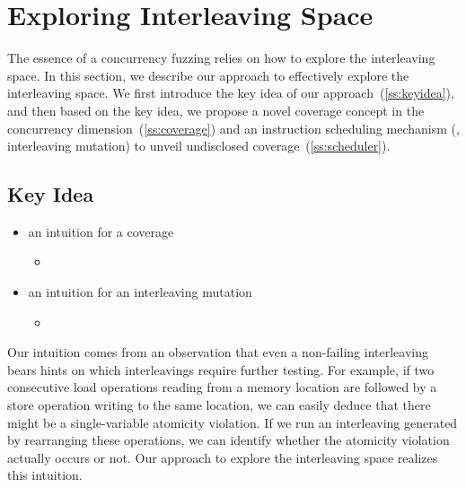 \section{Exploring Interleaving Space}
\label{s:design}

\newcommand{\segment}{segment graph\xspace}
\newcommand{\segments}{segment graphs\xspace}
\newcommand{\Segments}{Segment graphs\xspace}

\newcommand{\mutable}{mutable edge\xspace}
\newcommand{\mutables}{mutable edges\xspace}
\newcommand{\immutable}{immutable edge\xspace}
\newcommand{\immutables}{immutable edges\xspace}


The essence of a concurrency fuzzing relies on how to explore the
interleaving space.
%
In this section, we describe our approach to effectively explore the
interleaving space.
%
We first introduce the key idea of our
approach~(\autoref{ss:keyidea}), and then based on the key idea, we
propose a novel coverage concept in the concurrency
dimension~(\autoref{ss:coverage}) and an instruction scheduling
mechanism (\ie, interleaving mutation) to unveil undisclosed
coverage~(\autoref{ss:scheduler}).

\subsection{Key Idea}
\label{ss:keyidea}



\begin{itemize}
\item an intuition for a coverage
  \begin{itemize}
    \item
  \end{itemize}

\item an intuition for an interleaving mutation 
  \begin{itemize}
    \item
  \end{itemize}
\end{itemize}


Our intuition comes from an observation that even a non-failing
interleaving bears hints on which interleavings require further
testing.
%
For example, if two consecutive load operations reading from a memory
location are followed by a store operation writing to the same
location, we can easily deduce that there might be a single-variable
atomicity violation.
%
If we run an interleaving generated by rearranging these operations,
we can identify whether the atomicity violation actually occurs or
not.
%
Our approach to explore the interleaving space realizes this
intuition.


